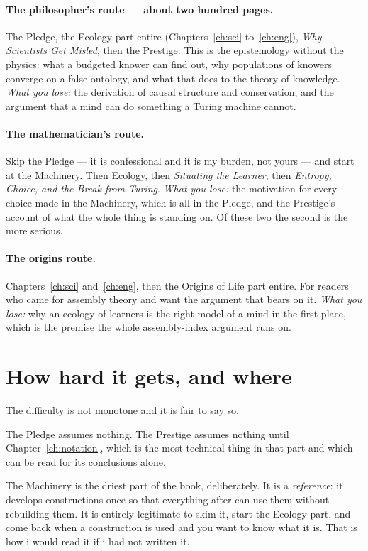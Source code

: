 \paragraph{The philosopher's route --- about two hundred pages.}
The Pledge, the Ecology part entire (Chapters~\ref{ch:sci}
to~\ref{ch:eng}), \emph{Why Scientists Get Misled}, then the
Prestige.
This is the epistemology without the physics: what a budgeted
knower can find out, why populations of knowers converge on a false
ontology, and what that does to the theory of knowledge.
\emph{What you lose:} the derivation of causal structure and
conservation, and the argument that a mind can do something a
Turing machine cannot.

\paragraph{The mathematician's route.}
Skip the Pledge --- it is confessional and it is my burden, not
yours --- and start at the Machinery.
Then Ecology, then \emph{Situating the Learner}, then
\emph{Entropy, Choice, and the Break from Turing}.
\emph{What you lose:} the motivation for every choice made in the
Machinery, which is all in the Pledge, and the Prestige's account
of what the whole thing is standing on.
Of these two the second is the more serious.

\paragraph{The origins route.}
Chapters~\ref{ch:sci} and~\ref{ch:eng}, then the Origins of Life
part entire.
For readers who came for assembly theory and want the argument that
bears on it.
\emph{What you lose:} why an ecology of learners is the right model
of a mind in the first place, which is the premise the whole
assembly-index argument runs on.

\section*{How hard it gets, and where}

The difficulty is not monotone and it is fair to say so.

The Pledge assumes nothing.
The Prestige assumes nothing until
Chapter~\ref{ch:notation}, which is the most technical thing in
that part and which can be read for its conclusions alone.

The Machinery is the driest part of the book, deliberately.
It is a \emph{reference}: it develops constructions once so that
everything after can use them without rebuilding them.
It is entirely legitimate to skim it, start the Ecology part, and
come back when a construction is used and you want to know what it
is.
That is how i would read it if i had not written it.

